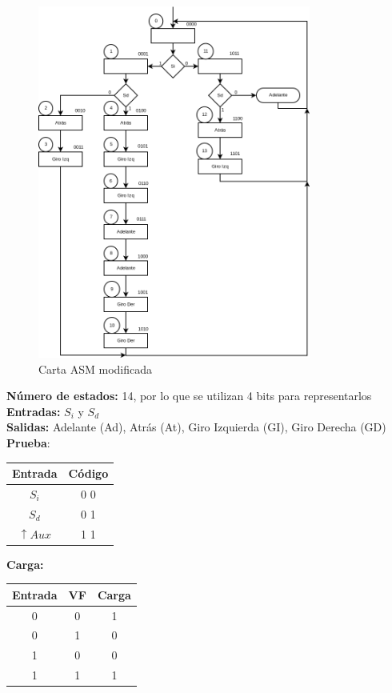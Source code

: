 \documentclass[12pt]{article}
\begin{document}
\begin{figure}[H]
	\centering
	\includegraphics[width=0.8\textwidth]{carta_asm_implicito}
	\caption{Carta ASM modificada}
\end{figure}

\noindent \textbf{N\'umero de estados:} 14, por lo que se utilizan 4 bits para representarlos\\
\textbf{Entradas:} $S_{i}$ y $S_{d}$\\
\textbf{Salidas:} Adelante (Ad), Atr\'as (At), Giro Izquierda (GI), Giro Derecha (GD)\\
\textbf{Prueba}:\\
\begin{center}
	\begin{tabular}{|c|c|}
		\hline
		 Entrada & C\'odigo\\
		\hline 
		$S_{i}$ & 0 0 \\ 
		\hline 
		$S_{d}$ & 0 1 \\ 
		\hline 
		$\uparrow Aux$ & 1 1 \\ 
		\hline 
	\end{tabular}
\end{center}

\newpage
\textbf{Carga:}\\
\begin{center}
	\begin{tabular}{|c|c|c|}
		\hline 
		Entrada & VF & Carga \\ 
		\hline 
		0 & 0 & 1 \\ 
		\hline 
		0 & 1 & 0 \\ 
		\hline 
		1 & 0 & 0 \\ 
		\hline 
		1 & 1 & 1 \\ 
		\hline 
	\end{tabular} 
\end{center}
\end{document}
